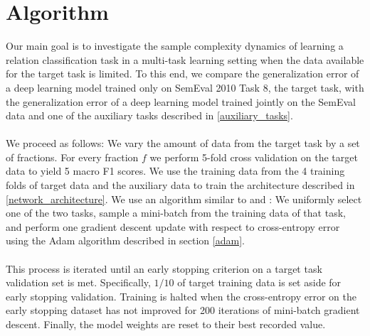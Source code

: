 \section{Algorithm}

Our main goal is to investigate the sample complexity dynamics of learning a relation classification task in a multi-task learning setting when the data available for the target task is limited. To this end, we compare the generalization error of a deep learning model trained only on SemEval 2010 Task 8, the target task, with the generalization error of a deep learning model trained jointly on the SemEval data and one of the auxiliary tasks described in \ref{auxiliary_tasks}.
\\\\
We proceed as follows: We vary the amount of data from the target task by a set of fractions. For every fraction $f$ we perform 5-fold cross validation on the target data to yield 5 macro F1 scores. We use the training data from the 4 training folds of target data and the auxiliary data to train the architecture described in \ref{network_architecture}. We use an algorithm similar to \citet{mou2016} and \citet{bingel2017}: We uniformly select one of the two tasks, sample a mini-batch from the training data of that task, and perform one gradient descent update with respect to cross-entropy error using the Adam algorithm described in section \ref{adam}.
\\\\
This process is iterated until an early stopping criterion on a target task validation set is met. Specifically, $1/10$ of target training data is set aside for early stopping validation. Training is halted when the cross-entropy error on the early stopping dataset has not improved for 200 iterations of mini-batch gradient descent. Finally, the model weights are reset to their best recorded value.

